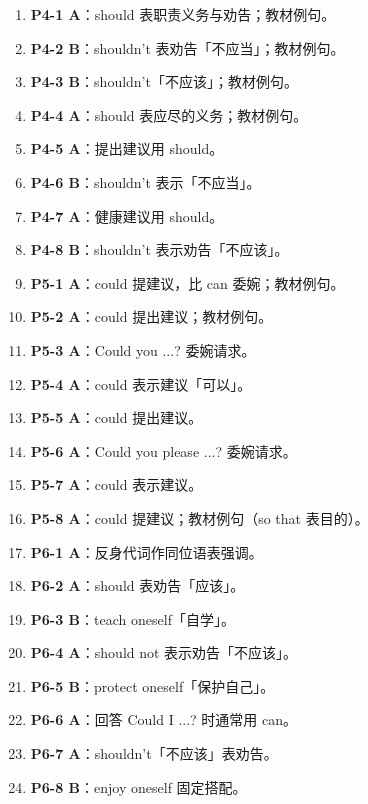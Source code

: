 \documentclass[11pt,a4paper]{ctexart}
\begin{document}
\begin{enumerate}[leftmargin=1.6em,itemsep=2pt]
\item \textbf{P4-1 A}：should 表职责义务与劝告；教材例句。
\item \textbf{P4-2 B}：shouldn’t 表劝告「不应当」；教材例句。
\item \textbf{P4-3 B}：shouldn’t「不应该」；教材例句。
\item \textbf{P4-4 A}：should 表应尽的义务；教材例句。
\item \textbf{P4-5 A}：提出建议用 should。
\item \textbf{P4-6 B}：shouldn’t 表示「不应当」。
\item \textbf{P4-7 A}：健康建议用 should。
\item \textbf{P4-8 B}：shouldn’t 表示劝告「不应该」。
\item \textbf{P5-1 A}：could 提建议，比 can 委婉；教材例句。
\item \textbf{P5-2 A}：could 提出建议；教材例句。
\item \textbf{P5-3 A}：Could you ...? 委婉请求。
\item \textbf{P5-4 A}：could 表示建议「可以」。
\item \textbf{P5-5 A}：could 提出建议。
\item \textbf{P5-6 A}：Could you please ...? 委婉请求。
\item \textbf{P5-7 A}：could 表示建议。
\item \textbf{P5-8 A}：could 提建议；教材例句（so that 表目的）。
\item \textbf{P6-1 A}：反身代词作同位语表强调。
\item \textbf{P6-2 A}：should 表劝告「应该」。
\item \textbf{P6-3 B}：teach oneself「自学」。
\item \textbf{P6-4 A}：should not 表示劝告「不应该」。
\item \textbf{P6-5 B}：protect oneself「保护自己」。
\item \textbf{P6-6 A}：回答 Could I ...? 时通常用 can。
\item \textbf{P6-7 A}：shouldn’t「不应该」表劝告。
\item \textbf{P6-8 B}：enjoy oneself 固定搭配。
\end{enumerate}
\end{document}
